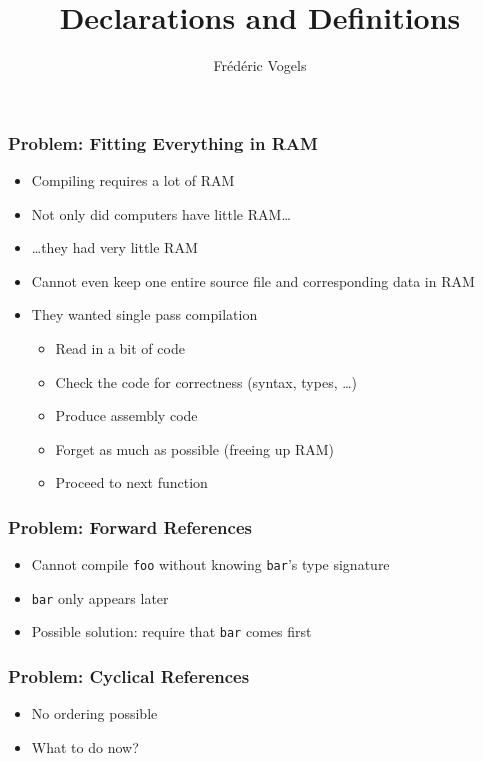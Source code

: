 \documentclass{../ucll-slides}
\title{Declarations and Definitions}
\author{Fr\'ed\'eric Vogels}
\begin{document}
\begin{frame}
  \titlepage
\end{frame}


\begin{frame}
  \frametitle{Problem: Fitting Everything in RAM}
  \begin{itemize}
    \item Compiling requires a lot of RAM
    \item Not only did computers have little RAM\dots
    \item \dots they had very little RAM
    \item Cannot even keep one entire source file and corresponding data in RAM
    \item They wanted single pass compilation
      \begin{itemize}
        \item Read in a bit of code
        \item Check the code for correctness (syntax, types, \dots)
        \item Produce assembly code
        \item Forget as much as possible (freeing up RAM)
        \item Proceed to next function
      \end{itemize}
  \end{itemize}
\end{frame}

\begin{frame}
  \frametitle{Problem: Forward References}
  \begin{itemize}
    \item Cannot compile {\tt foo} without knowing {\tt bar}'s type signature
    \item {\tt bar} only appears later
    \item Possible solution: require that {\tt bar} comes first
  \end{itemize}
\end{frame}

\begin{frame}
  \frametitle{Problem: Cyclical References}
  \begin{itemize}
    \item No ordering possible
    \item What to do now?
  \end{itemize}
\end{frame}
\end{document}

